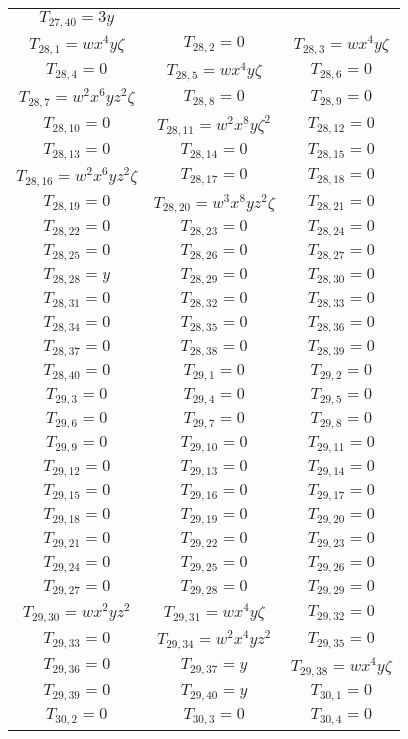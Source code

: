 \documentclass[12pt]{memoireuqam1.3}
\begin{document}
\begin{longtable}{|c|c|c|}
$T_{27,40}= 3y$\\
$T_{28,1}= wx^4y\zeta$&
$T_{28,2}= 0$&
$T_{28,3}= wx^4y\zeta$\\
$T_{28,4}= 0$&
$T_{28,5}= wx^4y\zeta$&
$T_{28,6}= 0$\\
$T_{28,7}= w^2x^6yz^2\zeta$&
$T_{28,8}= 0$&
$T_{28,9}= 0$\\
$T_{28,10}= 0$&
$T_{28,11}= w^2x^8y\zeta^2$&
$T_{28,12}= 0$\\
$T_{28,13}= 0$&
$T_{28,14}= 0$&
$T_{28,15}= 0$\\
$T_{28,16}= w^2x^6yz^2\zeta$&
$T_{28,17}= 0$&
$T_{28,18}= 0$\\
$T_{28,19}= 0$&
$T_{28,20}= w^3x^8yz^2\zeta$&
$T_{28,21}= 0$\\
$T_{28,22}= 0$&
$T_{28,23}= 0$&
$T_{28,24}= 0$\\
$T_{28,25}= 0$&
$T_{28,26}= 0$&
$T_{28,27}= 0$\\
$T_{28,28}= y$&
$T_{28,29}= 0$&
$T_{28,30}= 0$\\
$T_{28,31}= 0$&
$T_{28,32}= 0$&
$T_{28,33}= 0$\\
$T_{28,34}= 0$&
$T_{28,35}= 0$&
$T_{28,36}= 0$\\
$T_{28,37}= 0$&
$T_{28,38}= 0$&
$T_{28,39}= 0$\\
$T_{28,40}= 0$&
$T_{29,1}= 0$&
$T_{29,2}= 0$\\
$T_{29,3}= 0$&
$T_{29,4}= 0$&
$T_{29,5}= 0$\\
$T_{29,6}= 0$&
$T_{29,7}= 0$&
$T_{29,8}= 0$\\
$T_{29,9}= 0$&
$T_{29,10}= 0$&
$T_{29,11}= 0$\\
$T_{29,12}= 0$&
$T_{29,13}= 0$&
$T_{29,14}= 0$\\
$T_{29,15}= 0$&
$T_{29,16}= 0$&
$T_{29,17}= 0$\\
$T_{29,18}= 0$&
$T_{29,19}= 0$&
$T_{29,20}= 0$\\
$T_{29,21}= 0$&
$T_{29,22}= 0$&
$T_{29,23}= 0$\\
$T_{29,24}= 0$&
$T_{29,25}= 0$&
$T_{29,26}= 0$\\
$T_{29,27}= 0$&
$T_{29,28}= 0$&
$T_{29,29}= 0$\\
$T_{29,30}= wx^2yz^2$&
$T_{29,31}= wx^4y\zeta$&
$T_{29,32}= 0$\\
$T_{29,33}= 0$&
$T_{29,34}= w^2x^4yz^2$&
$T_{29,35}= 0$\\
$T_{29,36}= 0$&
$T_{29,37}= y$&
$T_{29,38}= wx^4y\zeta$\\
$T_{29,39}= 0$&
$T_{29,40}= y$&
$T_{30,1}= 0$\\
$T_{30,2}= 0$&
$T_{30,3}= 0$&
$T_{30,4}= 0$\\

\end{longtable}
\end{document}
